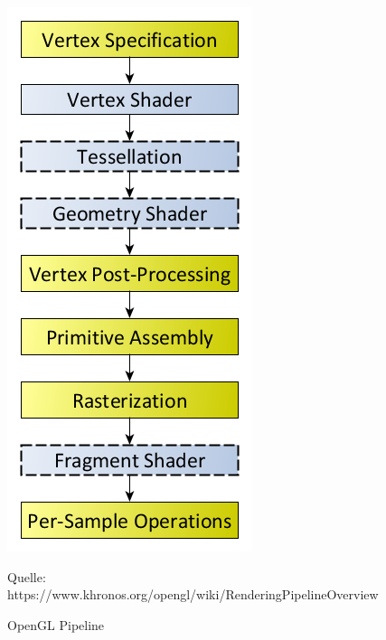 \begin{figure}
	\centering
	\includegraphics[scale=0.4]{02theorie/RenderingPipeline.png}
	
	
	Quelle: https://www.khronos.org/opengl/wiki/Rendering\textunderscore Pipeline\textunderscore Overview
	\caption{OpenGL Pipeline}\label{RenderingPipeling}
\end{figure}


